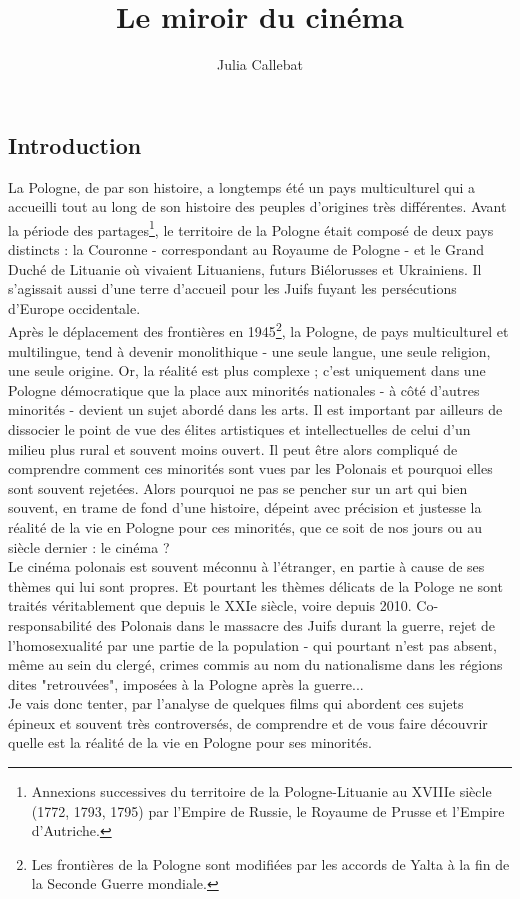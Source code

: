 \documentclass[12pt]{amsart}
\title{Le miroir du cinéma}
\author{Julia Callebat}
\begin{document}
\maketitle

\cleardoublepage
\tableofcontents


\cleardoublepage
\begin{multicols}{2}
\section*{Introduction}
\vspace*{10mm}
La Pologne, de par son histoire, a longtemps été un pays multiculturel qui a accueilli tout au long de son histoire des peuples d'origines très différentes. Avant la période des partages\footnote{Annexions successives du territoire de la Pologne-Lituanie au XVIIIe siècle (1772, 1793, 1795) par l'Empire de Russie, le Royaume de Prusse et l'Empire d'Autriche.}, le territoire de la Pologne était composé de deux pays distincts : la Couronne - correspondant au Royaume de Pologne - et le Grand Duché de Lituanie où vivaient Lituaniens, futurs Biélorusses et Ukrainiens. Il s'agissait aussi d'une terre d'accueil pour les Juifs fuyant les persécutions d'Europe occidentale. \\
Après le déplacement des frontières en 1945\footnote{Les frontières de la Pologne sont modifiées par les accords de Yalta à la fin de la Seconde Guerre mondiale.}, la Pologne, de pays multiculturel et multilingue, tend à devenir monolithique - une seule langue, une seule religion, une seule origine. Or, la réalité est plus complexe ; c'est uniquement dans une Pologne démocratique que la place aux minorités nationales - à côté d'autres minorités - devient un sujet abordé dans les arts. Il est important par ailleurs de dissocier le point de vue des élites artistiques et intellectuelles de celui d'un milieu plus rural et souvent moins ouvert. Il peut être alors compliqué de comprendre comment ces minorités sont vues par les Polonais et pourquoi elles sont souvent rejetées. Alors pourquoi ne pas se pencher sur un art qui bien souvent, en trame de fond d'une histoire, dépeint avec précision et justesse la réalité de la vie en Pologne pour ces minorités, que ce soit de nos jours ou au siècle dernier : le cinéma ?\\
Le cinéma polonais est souvent méconnu à l'étranger, en partie à cause de ses thèmes qui lui sont propres. Et pourtant les thèmes délicats de la Pologe ne sont traités véritablement que depuis le XXIe siècle, voire depuis 2010. Co-responsabilité des Polonais dans le massacre des Juifs durant la guerre, rejet de l'homosexualité par une partie de la population - qui pourtant n'est pas absent, même au sein du clergé, crimes commis au nom du nationalisme dans les régions dites "retrouvées", imposées à la Pologne après la guerre... \\
Je vais donc tenter, par l'analyse de quelques films qui abordent ces sujets épineux et souvent très controversés, de comprendre et de vous faire découvrir quelle est la réalité de la vie en Pologne pour ses minorités. 


\end{multicols}
\end{document}
